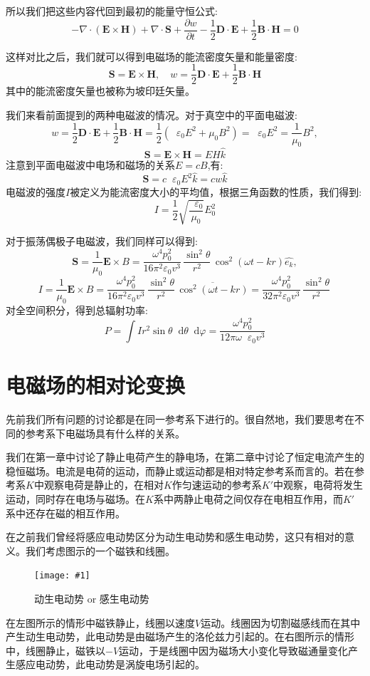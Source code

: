 \documentclass[12pt,a4paper,oneside]{report}
\theoremstyle{definition}
\theoremstyle{remark}
\newcommand{\insertfig}[3]{
    \begin{figure}[ht]
        \centering
        \texttt{[image: \#1]}
        \caption{#2}
        \label{fig:#1}
    \end{figure}
}
\newcommand{\mb}[1]{\mathbf{#1}}
\renewcommand{\d}{\mathop{}\!\mathrm{d}}
\renewcommand{\v}{\mathop{}\!\varepsilon}
\begin{document}
所以我们把这些内容代回到最初的能量守恒公式:
\[
-\nabla \cdot(\mb{E} \times \mb{H})+\nabla \cdot \mb{S} + \frac{\partial w}{\partial t} - \frac{1}{2}\mb{D}\cdot\mb{E}+\frac{1}{2}\mb{B}\cdot\mb{H} = 0
\]

这样对比之后，我们就可以得到电磁场的能流密度矢量和能量密度:
\[
\mb{S} = \mb{E} \times \mb{H}, \quad w = \frac{1}{2}\mb{D}\cdot\mb{E}+\frac{1}{2}\mb{B}\cdot\mb{H} 
\]
其中的能流密度矢量也被称为坡印廷矢量。

我们来看前面提到的两种电磁波的情况。对于真空中的平面电磁波:
\[
w = \frac{1}{2}\mb{D}\cdot\mb{E}+\frac{1}{2}\mb{B}\cdot\mb{H} = \frac{1}{2}(\v_0E^2+\mu_0B^2) = \v_0E^2 = \frac{1}{\mu_0}B^2,
\]
\[
\mb{S} = \mb{E} \times \mb{H} = EH\hat{k}
\]
注意到平面电磁波中电场和磁场的关系$E = cB$,有:
\[
\mb{S} = c\v_0E^2\hat{k} = cw\hat{k}
\]
电磁波的强度$I$被定义为能流密度大小的平均值，根据三角函数的性质，我们得到:
\[
I = \frac{1}{2}\sqrt{\frac{\v_0}{\mu_0}}E_0^2
\]

对于振荡偶极子电磁波，我们同样可以得到:
\[
\mb{S} =\frac{1}{\mu_0} \mb{E}\times{B} = \frac{\omega^4 p_0^2}{16\pi^2\varepsilon_0v^3}\,
\frac{\sin^2\theta}{r^2}\,
\cos^2(\omega t - kr)\hat{e_k},
\]
\[
I = \frac{1}{\mu_0} \mb{E}\times{B} = \frac{\omega^4 p_0^2}{16\pi^2\varepsilon_0v^3}\,
\frac{\sin^2\theta}{r^2}\,
\overline{\cos^2(\omega t - kr)} = \frac{\omega^4 p_0^2}{32\pi^2\varepsilon_0v^3}\,
\frac{\sin^2\theta}{r^2}\,
\]
对全空间积分，得到总辐射功率:
\[
P = \int I r^2\sin\theta\d\theta\d\varphi = \frac{\omega^4p_0^2}{12\pi\omega\v_0v^3}
\]

\section{电磁场的相对论变换}
先前我们所有问题的讨论都是在同一参考系下进行的。很自然地，我们要思考在不同的参考系下电磁场具有什么样的关系。

我们在第一章中讨论了静止电荷产生的静电场，在第二章中讨论了恒定电流产生的稳恒磁场。电流是电荷的运动，而静止或运动都是相对特定参考系而言的。若在参考系$K$中观察电荷是静止的，在相对$K$作匀速运动的参考系$K'$中观察，电荷将发生运动，同时存在电场与磁场。在$K$系中两静止电荷之间仅存在电相互作用，而$K'$系中还存在磁的相互作用。

在之前我们曾经将感应电动势区分为动生电动势和感生电动势，这只有相对的意义。我们考虑图示的一个磁铁和线圈。

\insertfig{5-5.png}{动生电动势 or 感生电动势}{0.5}

在左图所示的情形中磁铁静止，线圈以速度$V$运动。线圈因为切割磁感线而在其中产生动生电动势，此电动势是由磁场产生的洛伦兹力引起的。在右图所示的情形中，线圈静止，磁铁以$-V$运动，于是线圈中因为磁场大小变化导致磁通量变化产生感应电动势，此电动势是涡旋电场引起的。
\end{document}
